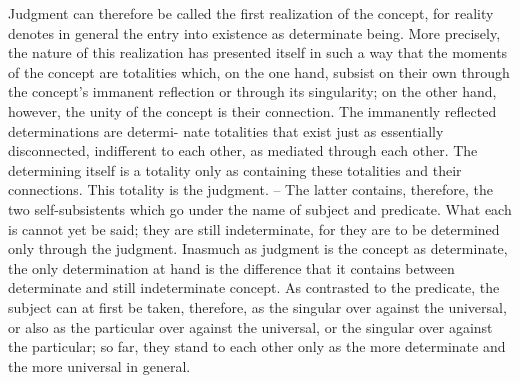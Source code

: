 Judgment can therefore be called the first realization of the concept,
for reality denotes in general the entry into existence as determinate being.
More precisely, the nature of this realization has presented itself in such
a way that the moments of the concept are totalities which, on the one
hand, subsist on their own through the concept’s immanent reflection or
through its singularity; on the other hand, however, the unity of the concept
is their connection. The immanently reflected determinations are determi-
nate totalities that exist just as essentially disconnected, indifferent to each
other, as mediated through each other. The determining itself is a totality
only as containing these totalities and their connections. This totality is the
judgment. – The latter contains, therefore, the two self-subsistents which
go under the name of subject and predicate. What each is cannot yet be said;
they are still indeterminate, for they are to be determined only through the
judgment. Inasmuch as judgment is the concept as determinate, the only
determination at hand is the difference that it contains between determinate
and still indeterminate concept. As contrasted to the predicate, the subject
can at first be taken, therefore, as the singular over against the universal, or
also as the particular over against the universal, or the singular over against
the particular; so far, they stand to each other only as the more determinate
and the more universal in general.


